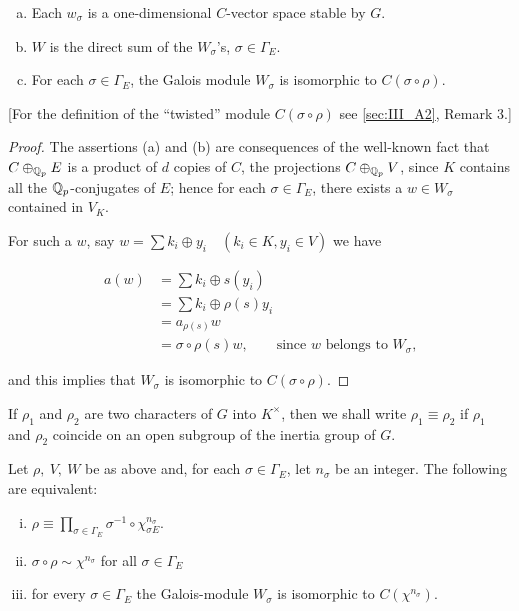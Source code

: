 \begin{subappendices}
\begin{lem}\label{lem:III_A5_1}
\begin{enumerate}[(a)]
	\item Each $w_\sigma$ is a one-dimensional $C$-vector space stable by
$G$.
	\item $W$ is the direct sum of the $W_\sigma$'s, $\sigma \in \Gamma_E$.
	\item For each $\sigma \in \Gamma_E$, the Galois module $W_\sigma$ is
isomorphic to $C(\sigma \circ \rho)$.
\end{enumerate}
\end{lem}
[For the definition of the ``twisted'' module $C(\sigma \circ \rho)$ see
\ref{sec:III_A2}, Remark 3.]

\begin{proof}
The assertions (a) and (b) are consequences of the well-known fact that $C
\oplus_{\mathbb{Q}_p} E$ is a product of $d$ copies of $C$, the projections $C
\oplus_{\mathbb{Q}_p} V$, since $K$ contains all the $\mathbb{Q}_p$-conjugates of $E$; hence for
each $\sigma \in \Gamma_E$, there exists a $w \in W_\sigma$ contained in $V_K$.

\dpage

For such a $w$, say $w = \sum k_i \oplus y_i \quad (k_i \in K, y_i \in V)$ we
have

\begin{align*}
	a(w) &= \sum k_i \oplus s(y_i)\\
	&= \sum k_i \oplus \rho(s)y_i\\
	&= a_{\rho(s)}w\\
	&= \sigma \circ \rho(s)w, \qquad \text{since $w$ belongs to $W_\sigma$,}
\end{align*}

and this implies that $W_\sigma$ is isomorphic to $C(\sigma \circ \rho)$.
\end{proof}

If $\rho_1$ and $\rho_2$ are two characters of $G$ into $K^\times$, then we shall
write $\rho_1 \equiv \rho_2$ if $\rho_1$ and $\rho_2$ coincide on an open
subgroup of the inertia group of $G$.

\begin{thm}\label{thm:III_A5_2}
Let $\rho,~V,~W$ be as above and, for each $\sigma \in \Gamma_E$, let $n_\sigma$
be an integer. The following are equivalent:
\begin{enumerate}[(i), series=thm_IIIA5_2]
	\item\label{thm:III_A5_2i}
		$\rho \equiv \prod_{\sigma \in \Gamma_E} \sigma^{-1} \circ
\chi_{\sigma E}^{n_\sigma}$.
	\item\label{thm:III_A5_2ii}
		$\sigma \circ \rho \sim \chi^{n_\sigma}$ for all $\sigma \in
\Gamma_E$
	\item\label{thm:III_A5_2iii}
		for every $\sigma \in \Gamma_E$ the Galois-module $W_\sigma$ is
isomorphic to $C(\chi^{n_\sigma})$.
\end{enumerate}
\end{thm}


\end{subappendices}

